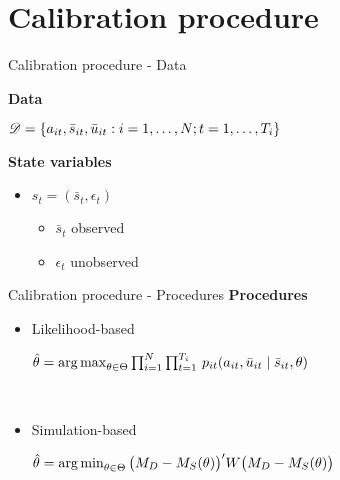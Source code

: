 \section{Calibration procedure}
\begin{frame}{Calibration procedure - Data}

\textbf{Data}\vspace{0.3cm}\\
\begin{lfalign*}
	$\mathcal{D} = \{a_{it}, \bar{s}_{it}, \bar{u}_{it}: i = 1, \hdots, N; t = 1, \hdots, T_i\}\\$
\end{lfalign*}

\textbf{State variables}\vspace{0.3cm}
\begin{itemize}\setlength\itemsep{1em}
\item $s_t = (\bar{s}_t, \epsilon_t)$\medskip
\begin{itemize}\setlength\itemsep{1em}
	\item $\bar{s}_t$ observed
	\item $\epsilon_t$ unobserved
\end{itemize}
\end{itemize}
\end{frame}
\begin{frame}{Calibration procedure - Procedures}
\textbf{Procedures}\vspace{0.5cm}\\
\begin{itemize}\setlength\itemsep{1em}
\item Likelihood-based\\\vspace{0.5cm}
\begin{lfalign*}
  $\hat{\theta} = \argmax_{\theta \in \Theta} \prod^N_{i= 1} \prod^{T_i}_{t= 1}\, p_{it}(a_{it}, \bar{u}_{it} \mid \bar{s}_{it}, \theta)$
\end{lfalign*}\\
\item Simulation-based\\\vspace{0.5cm}
\begin{lfalign*}
    $\hat{\theta} = \argmin_{\theta \in \Theta} \big(M_D - M_S(\theta)\big)' W \big(M_D - M_S(\theta)\big)$
\end{lfalign*}
\end{itemize}
\end{frame}
